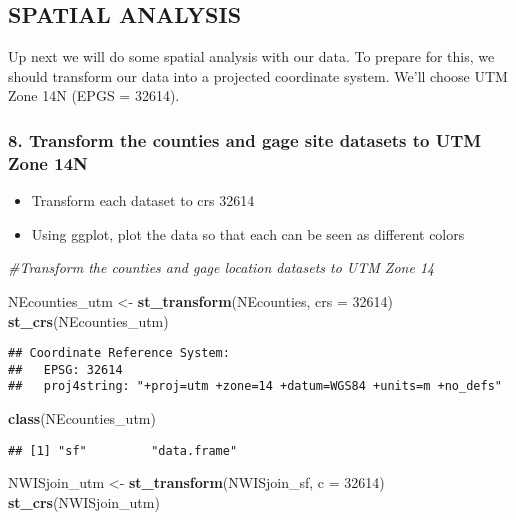 \documentclass[]{article}
\newenvironment{Shaded}{\begin{snugshade}}{\end{snugshade}}
\newcommand{\KeywordTok}[1]{\textcolor[rgb]{0.13,0.29,0.53}{\textbf{#1}}}
\newcommand{\DataTypeTok}[1]{\textcolor[rgb]{0.13,0.29,0.53}{#1}}
\newcommand{\DecValTok}[1]{\textcolor[rgb]{0.00,0.00,0.81}{#1}}
\newcommand{\StringTok}[1]{\textcolor[rgb]{0.31,0.60,0.02}{#1}}
\newcommand{\CommentTok}[1]{\textcolor[rgb]{0.56,0.35,0.01}{\textit{#1}}}
\newcommand{\NormalTok}[1]{#1}
\providecommand{\tightlist}{%
  \setlength{\itemsep}{0pt}\setlength{\parskip}{0pt}}
\begin{document}
\subsection{SPATIAL ANALYSIS}\label{spatial-analysis}

Up next we will do some spatial analysis with our data. To prepare for
this, we should transform our data into a projected coordinate system.
We'll choose UTM Zone 14N (EPGS = 32614).

\subsubsection{8. Transform the counties and gage site datasets to UTM
Zone
14N}\label{transform-the-counties-and-gage-site-datasets-to-utm-zone-14n}

\begin{itemize}
\tightlist
\item
  Transform each dataset to crs 32614
\item
  Using ggplot, plot the data so that each can be seen as different
  colors
\end{itemize}

\begin{Shaded}
\begin{Highlighting}[]
\CommentTok{#Transform the counties and gage location datasets to UTM Zone 14}

\NormalTok{NEcounties_utm <-}\StringTok{ }\KeywordTok{st_transform}\NormalTok{(NEcounties, }\DataTypeTok{crs =} \DecValTok{32614}\NormalTok{)}
\KeywordTok{st_crs}\NormalTok{(NEcounties_utm)}
\end{Highlighting}
\end{Shaded}

\begin{verbatim}
## Coordinate Reference System:
##   EPSG: 32614 
##   proj4string: "+proj=utm +zone=14 +datum=WGS84 +units=m +no_defs"
\end{verbatim}

\begin{Shaded}
\begin{Highlighting}[]
\KeywordTok{class}\NormalTok{(NEcounties_utm)}
\end{Highlighting}
\end{Shaded}

\begin{verbatim}
## [1] "sf"         "data.frame"
\end{verbatim}

\begin{Shaded}
\begin{Highlighting}[]
\NormalTok{NWISjoin_utm <-}\StringTok{ }\KeywordTok{st_transform}\NormalTok{(NWISjoin_sf, }\DataTypeTok{c =} \DecValTok{32614}\NormalTok{)}
\KeywordTok{st_crs}\NormalTok{(NWISjoin_utm)}
\end{Highlighting}
\end{Shaded}
\end{document}
